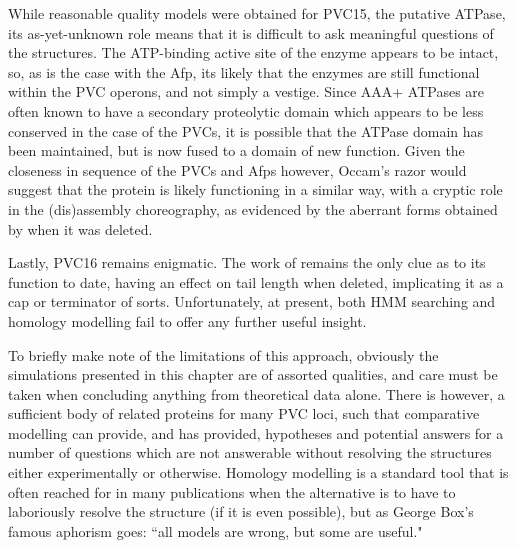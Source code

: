 While reasonable quality models were obtained for PVC15, the putative ATPase, its as-yet-unknown role means that it is difficult to ask meaningful questions of the structures. The ATP-binding active site of the enzyme appears to be intact, so, as is the case with the Afp, its likely that the enzymes are still functional within the PVC operons, and not simply a vestige. Since AAA+ ATPases are often known to have a secondary proteolytic domain which appears to be less conserved in the case of the PVCs, it is possible that the ATPase domain has been maintained, but is now fused to a domain of new function. Given the closeness in sequence of the PVCs and Afps however, Occam's razor would suggest that the protein is likely functioning in a similar way, with a cryptic role in the (dis)assembly choreography, as evidenced by the aberrant forms obtained by \cite{Hurst2004} when it was deleted.

Lastly, PVC16 remains enigmatic. The work of \cite{Rybakova2015} remains the only clue as to its function to date, having an effect on tail length when deleted, implicating it as a cap or terminator of sorts. Unfortunately, at present, both HMM searching and homology modelling fail to offer any further useful insight.

To briefly make note of the limitations of this approach, obviously the simulations presented in this chapter are of assorted qualities, and care must be taken when concluding anything from theoretical data alone. There is however, a sufficient body of related proteins for many PVC loci, such that comparative modelling can provide, and has provided, hypotheses and potential answers for a number of questions which are not answerable without resolving the structures either experimentally or otherwise. Homology modelling is a standard tool that is often reached for in many publications when the alternative is to have to laboriously resolve the structure (if it is even possible), but as George Box's famous aphorism goes: ``all models are wrong, but some are useful."

